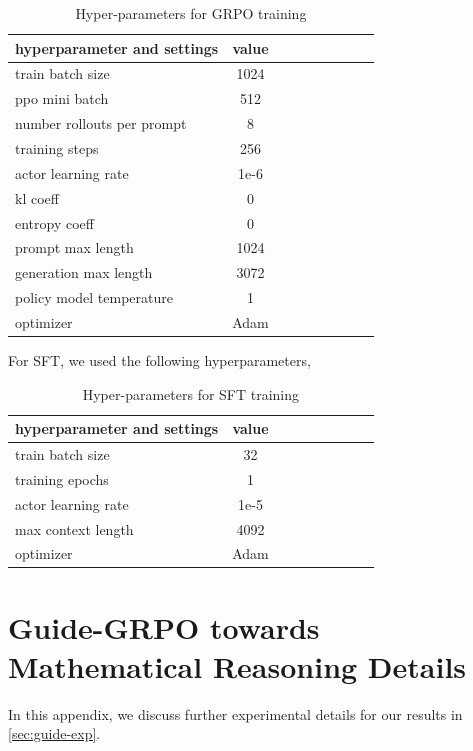\documentclass{article}
\begin{document}
{\begin{table}[H]
\caption{Hyper-parameters for GRPO training}
\centering
\begin{tabular}{lcccccccc}
\toprule
{hyperparameter and settings} & {value} \\
\midrule
train batch size & 1024 \\
ppo mini batch & 512 \\
number rollouts per prompt & 8 \\
training steps & 256 \\
actor learning rate & 1e-6 \\
kl coeff & 0 \\
entropy coeff & 0 \\
prompt max length & 1024 \\
generation max length & 3072 \\
policy model temperature & 1 \\
optimizer & Adam \\
\bottomrule
\end{tabular}
\vspace{0.3em}
\label{table:rlvr-grpo-hyperparameters}
\end{table}

For SFT, we used the following hyperparameters, 
\begin{table}[H]
\caption{Hyper-parameters for SFT training}
\centering
\begin{tabular}{lcccccccc}
\toprule
{hyperparameter and settings} & {value} \\
\midrule
train batch size & 32 \\
training epochs & 1 \\
actor learning rate & 1e-5 \\
max context length & 4092 \\
optimizer & Adam \\
\bottomrule
\end{tabular}
\vspace{0.3em}
\label{table:rlvr-sft-hyperparameters}
\end{table}

\section{Guide-GRPO towards Mathematical Reasoning Details}
\label{app:guide-exp}

In this appendix, we discuss further experimental details for our results in \ref{sec:guide-exp}.

}
\end{document}
